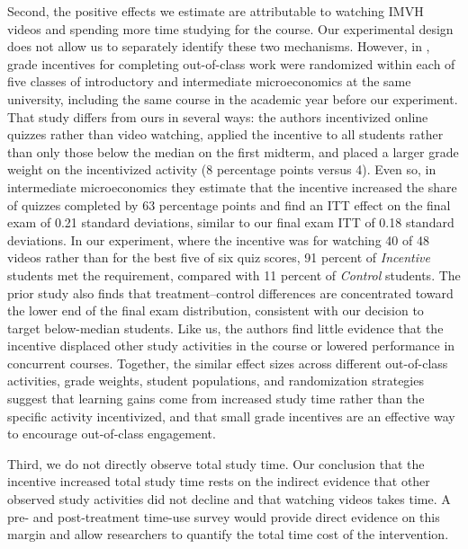Second, the positive effects we estimate are attributable to watching IMVH videos and spending more time studying for the course.
Our experimental design does not allow us to separately identify these two mechanisms.
However, in \textcite{afg2026}, grade incentives for completing out-of-class work were randomized within each of five classes of introductory and intermediate microeconomics at the same university, including the same course in the academic year before our experiment.
That study differs from ours in several ways: the authors incentivized online quizzes rather than video watching, applied the incentive to all students rather than only those below the median on the first midterm, and placed a larger grade weight on the incentivized activity (8 percentage points versus 4). 
Even so, in intermediate microeconomics they estimate that the incentive increased the share of quizzes completed by 63 percentage points and find an ITT effect on the final exam of 0.21 standard deviations, similar to our final exam ITT of 0.18 standard deviations.
In our experiment, where the incentive was for watching 40 of 48 videos rather than for the best five of six quiz scores, 91 percent of \textit{Incentive} students met the requirement, compared with 11 percent of \textit{Control} students.
The prior study also finds that treatment--control differences are concentrated toward the lower end of the final exam distribution, consistent with our decision to target below-median students.
Like us, the authors find little evidence that the incentive displaced other study activities in the course or lowered performance in concurrent courses.
Together, the similar effect sizes across different out-of-class activities, grade weights, student populations, and randomization strategies suggest that learning gains come from increased study time rather than the specific activity incentivized, and that small grade incentives are an effective way to encourage out-of-class engagement.

Third, we do not directly observe total study time.
Our conclusion that the incentive increased total study time rests on the indirect evidence that other observed study activities did not decline and that watching videos takes time.
A pre- and post-treatment time-use survey would provide direct evidence on this margin and allow researchers to quantify the total time cost of the intervention.


